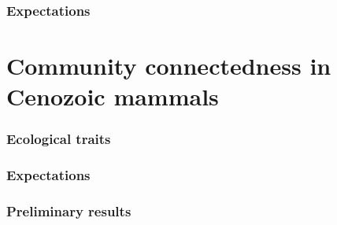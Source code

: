 \documentclass{beamer}
\begin{document}
\begin{frame}
  \frametitle{Expectations}
\end{frame}


\section{Community connectedness in Cenozoic mammals}

\begin{frame}
  \frametitle{Ecological traits}
\end{frame}

\begin{frame}
  \frametitle{Expectations}
\end{frame}

\begin{frame}
  \frametitle{Preliminary results}
\end{frame}
\end{document}
